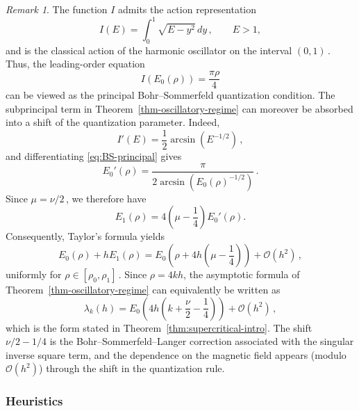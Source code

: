 \documentclass[11pt]{amsart}
\numberwithin{equation}{section}
\theoremstyle{remark}
\newtheorem{remark}[theorem]{Remark}
\begin{document}
\begin{remark}\label{rem:BSL}
The function $I$ admits the action representation
\begin{equation}\label{eq:action-I}
I(E)=\int_0^1\sqrt{E-y^2}\,dy\,,
\qquad E>1,
\end{equation}
and is the classical action of the harmonic oscillator on the
interval $(0,1)\,$. Thus, the leading-order equation
\begin{equation}\label{eq:BS-principal}
I(E_0(\rho))=\frac{\pi\rho}{4}
\end{equation}
can be viewed as the principal Bohr--Sommerfeld quantization
condition. The subprincipal term in Theorem~\ref{thm-oscillatory-regime}
can moreover be absorbed into 
a shift of the quantization parameter. Indeed,
\[
I'(E)=\frac12\arcsin(E^{-1/2})\,,
\]
and differentiating \eqref{eq:BS-principal} gives
\[
E_0'(\rho)
=
\frac{\pi}
{2\arcsin(E_0(\rho)^{-1/2})}\,.
\]
Since $\mu=\nu/2\,$, we therefore have
\begin{equation}\label{eq:E1-E0prime}
E_1(\rho)
=
4\left(\mu-\frac14\right)E_0'(\rho).
\end{equation}
Consequently, Taylor's formula yields
\[
E_0(\rho)+hE_1(\rho)
=
E_0\left(\rho+4h\left(\mu-\frac14\right)\right)
+\mathcal O(h^2)\,,
\]
uniformly for $\rho\in[\rho_0,\rho_1]\,$. Since $\rho=4kh$, the asymptotic formula of Theorem~\ref{thm-oscillatory-regime}
can equivalently be written as
\begin{equation}\label{eq:BSL-quantization}
\lambda_k(h)
=
E_0\left(
4h\left(k+\frac{\nu}{2}-\frac14\right)
\right)
+\mathcal O(h^2)\,,
\end{equation}
which is the form stated in Theorem~\ref{thm:supercritical-intro}.
The shift $\nu/2-1/4$ is the Bohr--Sommerfeld--Langer correction
associated with the singular inverse square term,  and the dependence on the magnetic field appears  (modulo $\mathcal O (h^2)$) through the shift in the quantization rule.
\end{remark}
%
%
%






\subsubsection{Heuristics}
\end{document}
